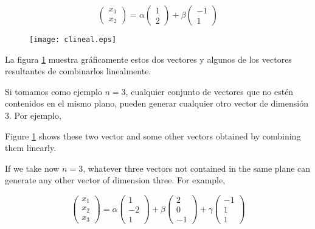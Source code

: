 \begin{equation*}
\begin{pmatrix}
x_1\\
x_2
\end{pmatrix}=
\alpha \begin{pmatrix}
1\\
2
\end{pmatrix}+\beta \begin{pmatrix}
-1\\
1
\end{pmatrix}
\end{equation*}



\begin{figure}[h]
\centering
\texttt{[image: clineal.eps]}
\label{fig:clineal}
\end{figure}

\begin{paracol}{2}
La figura \ref{fig:clineal} muestra gráficamente estos dos vectores y algunos de los vectores resultantes de combinarlos linealmente.

Si tomamos como ejemplo $n=3$, cualquier conjunto de vectores que no estén contenidos en el mismo plano, pueden generar cualquier otro vector de dimensión $3$. Por ejemplo,

\switchcolumn
Figure \ref{fig:clineal} shows these two vector and some other vectors obtained by combining them linearly.

If we take now $n=3$, whatever three vectors not contained in the same plane can generate any other vector of dimension three. For example,
\end{paracol}

\begin{equation*}
\begin{pmatrix}
x_1\\
x_2\\
x_3
\end{pmatrix}=\alpha \begin{pmatrix}
1\\
-2\\
1
\end{pmatrix}+ \beta \begin{pmatrix}
2\\
0\\
-1
\end{pmatrix}+ \gamma \begin{pmatrix}
-1\\
1\\
1
\end{pmatrix}
\end{equation*}


